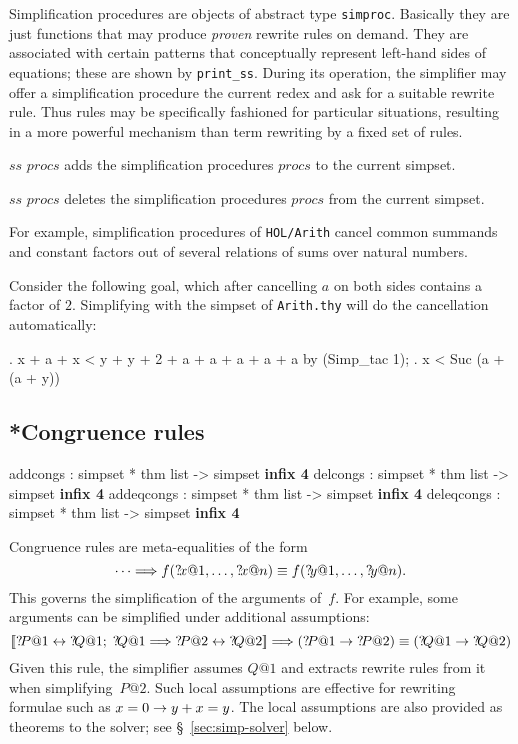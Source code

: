 Simplification procedures are {\ML} objects of abstract type
\texttt{simproc}.  Basically they are just functions that may produce
\emph{proven} rewrite rules on demand.  They are associated with
certain patterns that conceptually represent left-hand sides of
equations; these are shown by \texttt{print_ss}.  During its
operation, the simplifier may offer a simplification procedure the
current redex and ask for a suitable rewrite rule.  Thus rules may be
specifically fashioned for particular situations, resulting in a more
powerful mechanism than term rewriting by a fixed set of rules.


\begin{ttdescription}
  
\item[$ss$ \ttindexbold{addsimprocs} $procs$] adds the simplification
  procedures $procs$ to the current simpset.
  
\item[$ss$ \ttindexbold{delsimprocs} $procs$] deletes the simplification
  procedures $procs$ from the current simpset.

\end{ttdescription}

For example, simplification procedures  of
\texttt{HOL/Arith} cancel common summands and constant factors out of
several relations of sums over natural numbers.

Consider the following goal, which after cancelling $a$ on both sides
contains a factor of $2$.  Simplifying with the simpset of
\texttt{Arith.thy} will do the cancellation automatically:
\begin{ttbox}
{. x + a + x < y + y + 2 + a + a + a + a + a}
by (Simp_tac 1);
{. x < Suc (a + (a + y))}
\end{ttbox}


\subsection{*Congruence rules}\label{sec:simp-congs}
\begin{ttbox}
addcongs   : simpset * thm list -> simpset \hfill{\bf infix 4}
delcongs   : simpset * thm list -> simpset \hfill{\bf infix 4}
addeqcongs : simpset * thm list -> simpset \hfill{\bf infix 4}
deleqcongs : simpset * thm list -> simpset \hfill{\bf infix 4}
\end{ttbox}

Congruence rules are meta-equalities of the form
\[ \dots \Longrightarrow
   f({?\!x@1},\ldots,{?\!x@n}) \equiv f({?\!y@1},\ldots,{?\!y@n}).
\]
This governs the simplification of the arguments of~$f$.  For
example, some arguments can be simplified under additional assumptions:
\[ \List{\Var{P@1} \bimp \Var{Q@1};\; \Var{Q@1} \Imp \Var{P@2} \bimp \Var{Q@2}}
   \Imp (\Var{P@1} \imp \Var{P@2}) \equiv (\Var{Q@1} \imp \Var{Q@2})
\]
Given this rule, the simplifier assumes $Q@1$ and extracts rewrite
rules from it when simplifying~$P@2$.  Such local assumptions are
effective for rewriting formulae such as $x=0\rightarrow y+x=y$.  The local
assumptions are also provided as theorems to the solver; see
\S~\ref{sec:simp-solver} below.

